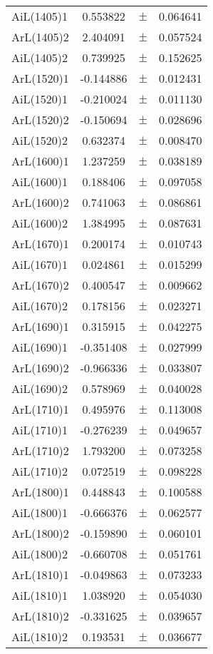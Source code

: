 \begin{table}
\begin{tiny}
\begin{tabular}{lccc}
AiL(1405)1 & 0.553822 & $\pm$ & 0.064641 \\
ArL(1405)2 & 2.404091 & $\pm$ & 0.057524 \\
AiL(1405)2 & 0.739925 & $\pm$ & 0.152625 \\
ArL(1520)1 & -0.144886 & $\pm$ & 0.012431 \\
AiL(1520)1 & -0.210024 & $\pm$ & 0.011130 \\
ArL(1520)2 & -0.150694 & $\pm$ & 0.028696 \\
AiL(1520)2 & 0.632374 & $\pm$ & 0.008470 \\
ArL(1600)1 & 1.237259 & $\pm$ & 0.038189 \\
AiL(1600)1 & 0.188406 & $\pm$ & 0.097058 \\
ArL(1600)2 & 0.741063 & $\pm$ & 0.086861 \\
AiL(1600)2 & 1.384995 & $\pm$ & 0.087631 \\
ArL(1670)1 & 0.200174 & $\pm$ & 0.010743 \\
AiL(1670)1 & 0.024861 & $\pm$ & 0.015299 \\
ArL(1670)2 & 0.400547 & $\pm$ & 0.009662 \\
AiL(1670)2 & 0.178156 & $\pm$ & 0.023271 \\
ArL(1690)1 & 0.315915 & $\pm$ & 0.042275 \\
AiL(1690)1 & -0.351408 & $\pm$ & 0.027999 \\
ArL(1690)2 & -0.966336 & $\pm$ & 0.033807 \\
AiL(1690)2 & 0.578969 & $\pm$ & 0.040028 \\
ArL(1710)1 & 0.495976 & $\pm$ & 0.113008 \\
AiL(1710)1 & -0.276239 & $\pm$ & 0.049657 \\
ArL(1710)2 & 1.793200 & $\pm$ & 0.073258 \\
AiL(1710)2 & 0.072519 & $\pm$ & 0.098228 \\
ArL(1800)1 & 0.448843 & $\pm$ & 0.100588 \\
AiL(1800)1 & -0.666376 & $\pm$ & 0.062577 \\
ArL(1800)2 & -0.159890 & $\pm$ & 0.060101 \\
AiL(1800)2 & -0.660708 & $\pm$ & 0.051761 \\
ArL(1810)1 & -0.049863 & $\pm$ & 0.073233 \\
AiL(1810)1 & 1.038920 & $\pm$ & 0.054030 \\
ArL(1810)2 & -0.331625 & $\pm$ & 0.039657 \\
AiL(1810)2 & 0.193531 & $\pm$ & 0.036677 \\

\end{tabular}
\end{tiny}
\end{table}
